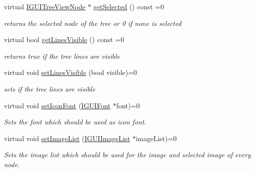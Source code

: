 \begin{DoxyCompactItemize}
\mbox{\label{classirr_1_1gui_1_1IGUITreeView_abcdbd869a9e4b6a67ddb94aa4c058c2d}} 
virtual \hyperlink{classirr_1_1gui_1_1IGUITreeViewNode}{I\+G\+U\+I\+Tree\+View\+Node} $\ast$ \hyperlink{classirr_1_1gui_1_1IGUITreeView_abcdbd869a9e4b6a67ddb94aa4c058c2d}{get\+Selected} () const =0
\begin{DoxyCompactList}\small\item\em returns the selected node of the tree or 0 if none is selected \end{DoxyCompactList}\item 
\mbox{\label{classirr_1_1gui_1_1IGUITreeView_a4f03b904367e362ddc4413c46974d32f}} 
virtual bool \hyperlink{classirr_1_1gui_1_1IGUITreeView_a4f03b904367e362ddc4413c46974d32f}{get\+Lines\+Visible} () const =0
\begin{DoxyCompactList}\small\item\em returns true if the tree lines are visible \end{DoxyCompactList}\item 
virtual void \hyperlink{classirr_1_1gui_1_1IGUITreeView_a7894df49d2f0f3d20e9e998ab1cac373}{set\+Lines\+Visible} (bool visible)=0
\begin{DoxyCompactList}\small\item\em sets if the tree lines are visible \end{DoxyCompactList}\item 
virtual void \hyperlink{classirr_1_1gui_1_1IGUITreeView_a07707331410d7792557c81c90ef4a09b}{set\+Icon\+Font} (\hyperlink{classirr_1_1gui_1_1IGUIFont}{I\+G\+U\+I\+Font} $\ast$font)=0
\begin{DoxyCompactList}\small\item\em Sets the font which should be used as icon font. \end{DoxyCompactList}\item 
virtual void \hyperlink{classirr_1_1gui_1_1IGUITreeView_aaa55170154f44d17e2a8129368c1a010}{set\+Image\+List} (\hyperlink{classirr_1_1gui_1_1IGUIImageList}{I\+G\+U\+I\+Image\+List} $\ast$image\+List)=0
\begin{DoxyCompactList}\small\item\em Sets the image list which should be used for the image and selected image of every node. \end{DoxyCompactList}\item 
\mbox{\label{classirr_1_1gui_1_1IGUITreeView_aeae0fa8b33064209ddc604aec45d461c}} 

\end{DoxyCompactItemize}
